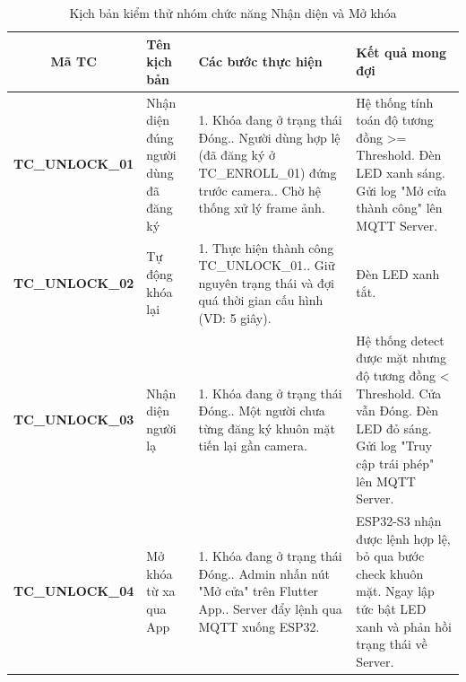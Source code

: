 \begin{table}[H]
    \centering
    \caption{Kịch bản kiểm thử nhóm chức năng Nhận diện và Mở khóa}
    \label{tab:tc_unlock}
    \small
    \begin{tabularx}{\textwidth}{|c|X|X|X|}
\hline
\textbf{Mã TC} & \textbf{Tên kịch bản} & \textbf{Các bước thực hiện} & \textbf{Kết quả mong đợi} \\
\hline
\textbf{TC\_UNLOCK\_01} & Nhận diện đúng người dùng đã đăng ký &
1. Khóa đang ở trạng thái Đóng.\newline
2. Người dùng hợp lệ (đã đăng ký ở TC\_ENROLL\_01) đứng trước camera.\newline
3. Chờ hệ thống xử lý frame ảnh. &
Hệ thống tính toán độ tương đồng >= Threshold. Đèn LED xanh sáng. Gửi log "Mở cửa thành công" lên MQTT Server. \\
\hline
\textbf{TC\_UNLOCK\_02} & Tự động khóa lại &
1. Thực hiện thành công TC\_UNLOCK\_01.\newline
2. Giữ nguyên trạng thái và đợi quá thời gian cấu hình (VD: 5 giây). & Đèn LED xanh tắt. \\
\hline
\textbf{TC\_UNLOCK\_03} & Nhận diện người lạ  &
1. Khóa đang ở trạng thái Đóng.\newline
2. Một người chưa từng đăng ký khuôn mặt tiến lại gần camera. &
Hệ thống detect được mặt nhưng độ tương đồng < Threshold. Cửa vẫn Đóng. Đèn LED đỏ sáng. Gửi log "Truy cập trái phép" lên MQTT Server. \\
\hline
\textbf{TC\_UNLOCK\_04} & Mở khóa từ xa qua App &
1. Khóa đang ở trạng thái Đóng.\newline
2. Admin nhấn nút "Mở cửa" trên Flutter App.\newline
3. Server đẩy lệnh qua MQTT xuống ESP32. &
ESP32-S3 nhận được lệnh hợp lệ, bỏ qua bước check khuôn mặt. Ngay lập tức bật LED xanh và phản hồi trạng thái về Server. \\
\hline
    \end{tabularx}
\end{table}